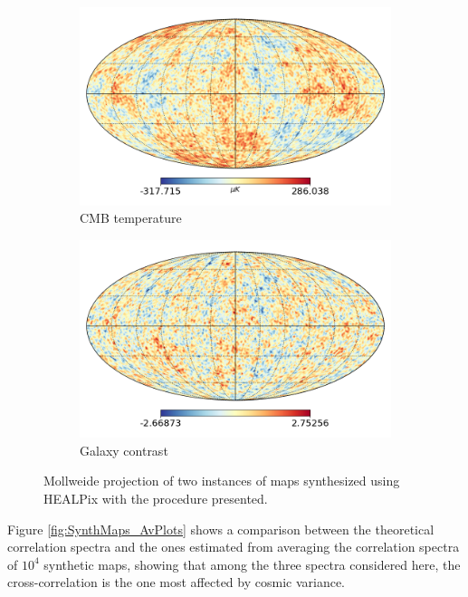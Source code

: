 \documentclass[openany,a4paper,12pt,oneside]{book}
\begin{document}
\begin{spacing}{1.5}
\begin{figure}[!htb]
	\centering
	\begin{subfigure}[b]{0.49\textwidth}
		\includegraphics[width=\linewidth]{Imagens/SynthMap_CMB.png}
		\caption{CMB temperature}
		\label{subfig:CMB_synthmap}
	\end{subfigure}
	\hfill
	\begin{subfigure}[b]{0.49\textwidth}
		\includegraphics[width=\linewidth]{Imagens/SynthMap_Galaxy.png}
		\caption{Galaxy contrast}
		\label{subfig:galaxy_synthmap}
	\end{subfigure}
	\caption{Mollweide projection of two instances of maps synthesized using HEALPix with the procedure presented.}
	\label{fig:SynthMaps}
\end{figure} 

Figure \ref{fig:SynthMaps_AvPlots} shows a comparison between the theoretical correlation spectra and the ones estimated from averaging the correlation spectra of $10^4$ synthetic maps, showing that among the three spectra considered here, the cross-correlation is the one most affected by cosmic variance.


\end{spacing}
\end{document}
